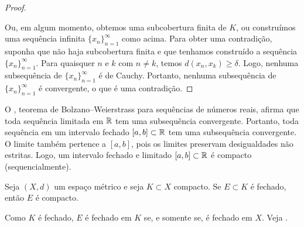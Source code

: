 \begin{proof}
\begin{myfigureht}
\caption{Cobertura de $K$ por $U_{\lambda}$. Estão desenhados os pontos
$x_1,x_2,x_3,x_4$,
os três conjuntos
$U_{\lambda_1}$,
$U_{\lambda_2}$,
$U_{\lambda_3}$,
e as três primeiras bolas
de raio $\delta$.\label{fig:seqcompactiscompact}}
\end{myfigureht}

Ou, em algum momento, obtemos uma subcobertura finita de $K$,
ou construímos uma sequência infinita $\{ x_n \}_{n=1}^\infty$ como acima.
Para obter uma contradição, suponha que não haja subcobertura finita e que
tenhamos construído a sequência $\{ x_n \}_{n=1}^\infty$.
Para quaisquer $n$ e $k$ com $n \neq k$,
temos $d(x_n,x_k) \geq \delta$.
Logo, nenhuma subsequência de $\{ x_n \}_{n=1}^\infty$ é de Cauchy.
Portanto, nenhuma subsequência de $\{ x_n \}_{n=1}^\infty$ é convergente,
o que é uma contradição.
\end{proof}

\begin{example} \label{example:intervalcompact}
O ,
teorema de Bolzano--Weierstrass para sequências de números reais,
afirma que toda sequência limitada em ${\mathbb{R}}$ tem uma subsequência convergente.
Portanto, toda sequência em um intervalo fechado $[a,b] \subset {\mathbb{R}}$ tem
uma subsequência convergente. O limite também pertence a $[a,b]$, pois os
limites preservam desigualdades não estritas. Logo, um intervalo fechado e
limitado $[a,b] \subset {\mathbb{R}}$ é compacto (sequencialmente).
\end{example}

\begin{prop} \label{prop:closedsubsetcompact}
Seja $(X,d)$ um espaço métrico e seja $K \subset X$ compacto. Se
$E \subset K$ é fechado, então $E$ é compacto.
\end{prop}

Como $K$ é fechado, $E$ é fechado em $K$ se, e somente se, é fechado em $X$.
Veja .

